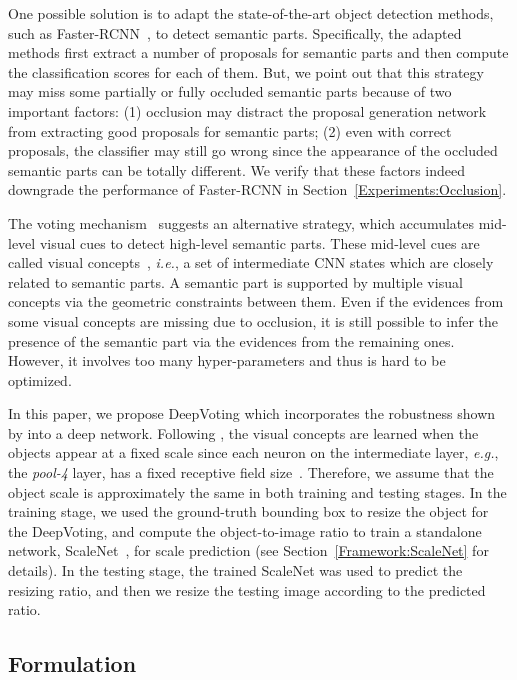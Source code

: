 \documentclass[10pt,twocolumn,letterpaper]{article}
\begin{document}
  One possible solution is to adapt the state-of-the-art object detection methods, such as Faster-RCNN~\cite{Ren_2015_Faster}, to detect semantic parts. Specifically, the adapted methods first extract a number of proposals for semantic parts and then compute the classification scores for each of them. But, we point out that this strategy may miss some partially or fully occluded semantic parts because of two important factors: (1) occlusion may distract the proposal generation network from extracting good proposals for semantic parts; (2) even with correct proposals, the classifier may still go wrong since the appearance of the occluded semantic parts can be totally different. We verify that these factors indeed downgrade the performance of Faster-RCNN in Section~\ref{Experiments:Occlusion}.

  The voting mechanism~\cite{wang2017detecting} suggests an alternative strategy, which accumulates mid-level visual cues to detect high-level semantic parts. These mid-level cues are called visual concepts~\cite{Wang_2017_VC_journal},  {\em i.e.}, a set of intermediate CNN states which are closely related to semantic parts. A semantic part is supported by multiple visual concepts via the geometric constraints between them. Even if the evidences from some visual concepts are missing due to occlusion, it is still possible to infer the presence of the semantic part via the evidences from the remaining ones. However, it involves too many hyper-parameters and thus is hard to be optimized.

  In this paper, we propose DeepVoting which incorporates the robustness shown by \cite{wang2017detecting} into a deep network. Following \cite{Wang_2017_VC_journal}, the visual concepts are learned when the objects appear at a fixed scale since each neuron on the intermediate layer, {\em e.g.}, the {\em pool-4} layer, has a fixed receptive field size~\cite{Simonyan_2015_Very}. Therefore, we assume that the object scale is approximately the same in both training and testing stages. In the training stage, we used the ground-truth bounding box to resize the object for the DeepVoting, and compute the object-to-image ratio to train a standalone network, ScaleNet~\cite{Qiao_2017_ScaleNet}, for scale prediction (see Section~\ref{Framework:ScaleNet} for details). In the testing stage, the trained ScaleNet was used to predict the resizing ratio, and then we resize the testing image according to the predicted ratio.


  \subsection{Formulation}
  \label{Framework:Formulation}
\end{document}
